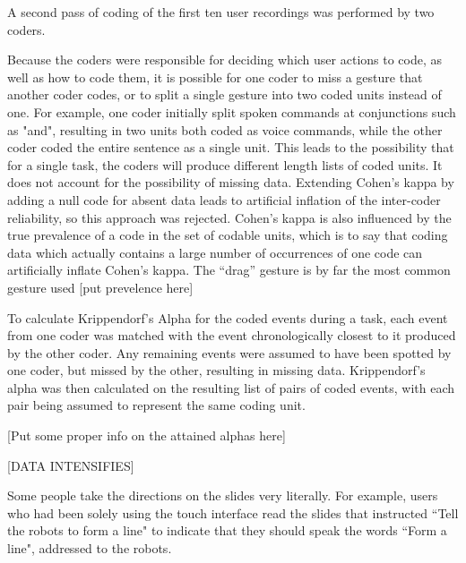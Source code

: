 
A second pass of coding of the first ten user recordings was performed by two coders. 

Because the coders were responsible for deciding which user actions to code, as well as how to code them, it is possible for one coder to miss a gesture that another coder codes, or to split a single gesture into two coded units instead of one. 
For example, one coder initially split spoken commands at conjunctions such as "and", resulting in two units both coded as voice commands, while the other coder coded the entire sentence as a single unit. 
This leads to the possibility that for a single task, the coders will produce different length lists of coded units. 
It does not account for the possibility of missing data. 
Extending Cohen's kappa by adding a null code for absent data leads to artificial inflation of the inter-coder reliability, so this approach was rejected.
Cohen's kappa is also influenced by the true prevalence of a code in the set of codable units, which is to say that coding data which actually contains a large number of occurrences of one code can artificially inflate Cohen's kappa. 
The ``drag'' gesture is by far the most common gesture used [put prevelence here] 


To calculate Krippendorf's Alpha for the coded events during a task, each event from one coder was matched with the event chronologically closest to it produced by the other coder.
Any remaining events were assumed to have been spotted by one coder, but missed by the other, resulting in missing data. 
Krippendorf's alpha was then calculated on the resulting list of pairs of coded events, with each pair being assumed to represent the same coding unit. 

[Put some proper info on the attained alphas here]



[DATA INTENSIFIES]
 
Some people  take the directions on the slides very literally. 
For example, users who had been solely using the touch interface read the slides that instructed ``Tell the robots to form a line" to indicate that they should speak the words ``Form a line", addressed to the robots.

